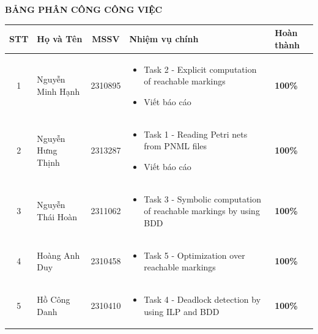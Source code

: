 \documentclass[12pt,a4paper]{article}
\begin{document}
\begin{center}
    {\LARGE\bfseries BẢNG PHÂN CÔNG CÔNG VIỆC\par}
    \vspace{1.8cm}

    {\footnotesize
    \begin{tabular}{|c|>{\centering\arraybackslash}p{3.8cm}|c|>{\raggedright\arraybackslash}p{7.0cm}|>{\centering\arraybackslash}p{2.2cm}|}
    \hline
    \textbf{STT} & \textbf{Họ và Tên} & \textbf{MSSV} & \textbf{Nhiệm vụ chính} & \textbf{Hoàn thành} \\
    \hline
    1 & Nguyễn Minh Hạnh & 2310895 &
    \begin{itemize}[leftmargin=*,nosep]
        \item Task 2 - Explicit computation of reachable markings
        \item Viết báo cáo
    \end{itemize} & {\textbf{100\%}} \\
    \hline
    2 & Nguyễn Hưng Thịnh & 2313287 &
    \begin{itemize}[leftmargin=*,nosep]
        \item Task 1 - Reading Petri nets from PNML files
        \item Viết báo cáo
    \end{itemize} & {\textbf{100\%}} \\
    \hline
    3 & Nguyễn Thái Hoàn & 2311062 &
    \begin{itemize}[leftmargin=*,nosep]
        \item Task 3 - Symbolic computation of reachable markings by using BDD
    \end{itemize} & {\textbf{100\%}} \\
    \hline
    4 & Hoàng Anh Duy & 2310458 &
    \begin{itemize}[leftmargin=*,nosep]
        \item Task 5 - Optimization over reachable markings
    \end{itemize} & {\textbf{100\%}} \\
    \hline
    5 & Hồ Công Danh & 2310410 &
    \begin{itemize}[leftmargin=*,nosep]
        \item Task 4 - Deadlock detection by using ILP and BDD
    \end{itemize} & {\textbf{100\%}} \\
    \hline
    \end{tabular}
    }
\end{center}
\end{document}
